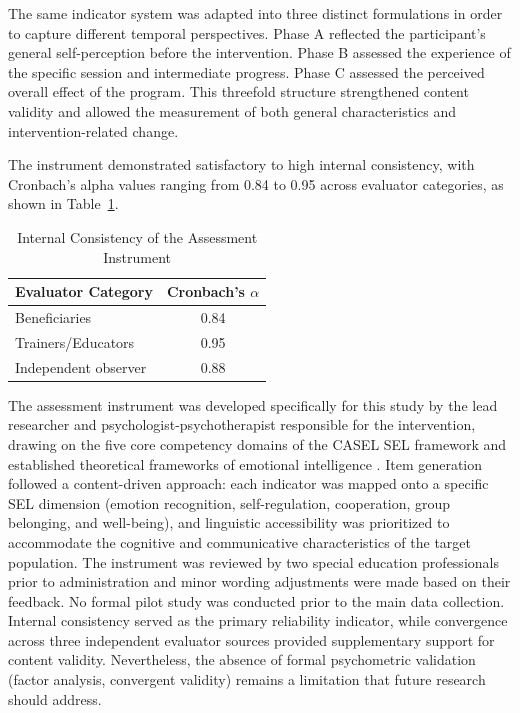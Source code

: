 \documentclass[journal]{IEEEtran}
\begin{document}
The same indicator system was adapted into three distinct formulations in order to capture different temporal perspectives. Phase A reflected the participant's general self-perception before the intervention. Phase B assessed the experience of the specific session and intermediate progress. Phase C assessed the perceived overall effect of the program. This threefold structure strengthened content validity and allowed the measurement of both general characteristics and intervention-related change.

The instrument demonstrated satisfactory to high internal consistency, with Cronbach's alpha values ranging from 0.84 to 0.95 across evaluator categories, as shown in Table~\ref{tab:cronbach}.

\begin{table}[!t]
\caption{Internal Consistency of the Assessment Instrument}
\label{tab:cronbach}
\centering
\begin{tabular}{lc}
\hline
\textbf{Evaluator Category} & \textbf{Cronbach's $\alpha$} \\
\hline
Beneficiaries & 0.84 \\
Trainers/Educators & 0.95 \\
Independent observer & 0.88 \\
\hline
\end{tabular}
\end{table}

The assessment instrument was developed specifically for this study
by the lead researcher and psychologist-psychotherapist responsible
for the intervention, drawing on the five core competency domains
of the CASEL SEL framework \cite{casel2020} and established
theoretical frameworks of emotional intelligence \cite{goleman1995}.
Item generation followed a content-driven approach: each indicator
was mapped onto a specific SEL dimension (emotion recognition,
self-regulation, cooperation, group belonging, and well-being),
and linguistic accessibility was prioritized to accommodate the
cognitive and communicative characteristics of the target population.
The instrument was reviewed by two special education professionals
prior to administration and minor wording adjustments were made
based on their feedback. No formal pilot study was conducted prior
to the main data collection. Internal consistency served as the
primary reliability indicator, while convergence across three
independent evaluator sources provided supplementary support for
content validity. Nevertheless, the absence of formal psychometric
validation (factor analysis, convergent validity) remains a
limitation that future research should address.
\end{document}
